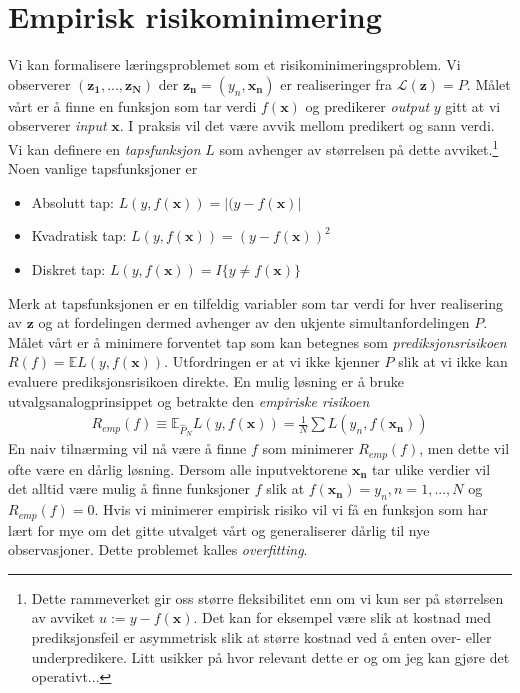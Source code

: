 \section{Empirisk risikominimering}
Vi kan formalisere læringsproblemet som et risikominimeringsproblem. Vi observerer $(\mathbf{z_1},..., \mathbf{z_N})$ der $\mathbf{z_n}=(y_n,\mathbf{x_n})$ er realiseringer fra $\mathcal{L}(\mathbf{z})=P$. Målet vårt er å finne en funksjon som tar verdi $f(\mathbf{x})$ og predikerer \textit{output} $y$ gitt at vi observerer \textit{input} $\mathbf{x}$. I praksis vil det være avvik mellom predikert og sann verdi. Vi kan definere en \textit{tapsfunksjon} $L$ som avhenger av størrelsen på dette avviket.\footnote{Dette rammeverket gir oss større fleksibilitet enn om vi kun ser på størrelsen av avviket $u:=y-f(\mathbf{x})$. Det kan for eksempel være slik at kostnad med prediksjonsfeil er asymmetrisk slik at større kostnad ved å enten over- eller underpredikere. Litt usikker på hvor relevant dette er og om jeg kan gjøre det operativt...} Noen vanlige tapsfunksjoner er
\begin{itemize}
\item Absolutt tap: $L(y,f(\mathbf{x})) = |(y-f(\mathbf{x})|$
\item Kvadratisk tap: $L(y,f(\mathbf{x})) = (y-f(\mathbf{x}))^2$
\item Diskret tap: $L(y,f(\mathbf{x})) = I\{y \neq f(\mathbf{x})\}$
\end{itemize}
Merk at tapsfunksjonen er en tilfeldig variabler som tar verdi for hver realisering av $\mathbf{z}$ og at fordelingen dermed avhenger av den ukjente simultanfordelingen $P$. Målet vårt er å minimere forventet tap som kan betegnes som \textit{prediksjonsrisikoen} $R(f)=\mathbb{E}L(y,f(\mathbf{x}))$. Utfordringen er at vi ikke kjenner $P$ slik at vi ikke kan evaluere prediksjonsrisikoen direkte. En mulig løsning er å bruke utvalgsanalogprinsippet og betrakte den \textit{empiriske risikoen}
\begin{align}
R_{emp}(f) \equiv \mathbb{E}_{\hat{P}_N}L(y,f(\mathbf{x})) = \frac{1}{N}\sum L(y_n,f(\mathbf{x_n}))
\end{align}
En naiv tilnærming vil nå være å finne $f$ som minimerer $R_{emp}(f)$, men dette vil ofte være en dårlig løsning. Dersom alle inputvektorene $\mathbf{x_n}$ tar ulike verdier vil det alltid være mulig å finne funksjoner $f$ slik at $f(\mathbf{x_n})=y_n, n = 1,...,N$ og $R_{emp}(f) = 0$. Hvis vi minimerer empirisk risiko vil vi få en funksjon som har lært for mye om det gitte utvalget vårt og generaliserer dårlig til nye observasjoner. Dette problemet kalles \textit{overfitting}. 

